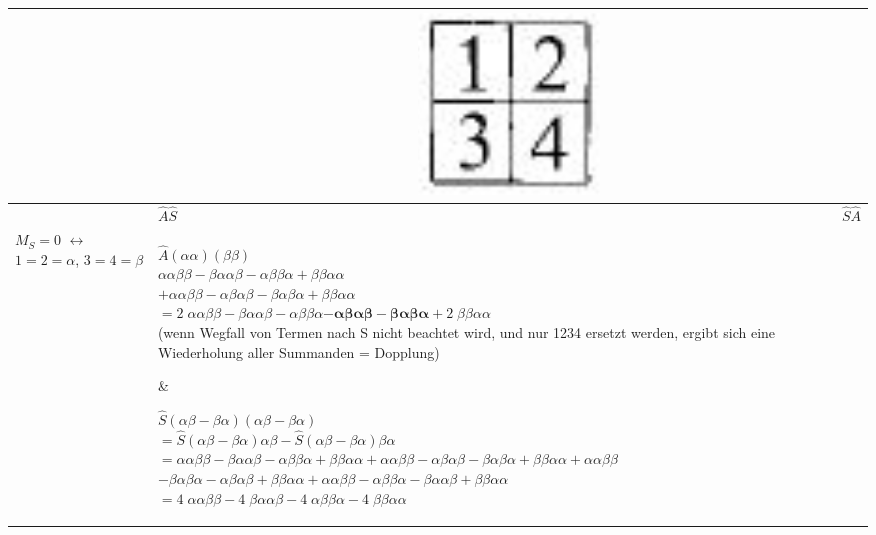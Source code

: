 \documentclass[12pt,a4paper]{article}
\begin{document}
\begin{table}[H]
\begin{tabular}{|p{2cm}|p{7cm}|p{7cm}|}
  \hline 
 & \multicolumn{2}{c|}{ \includegraphics[scale=0.2]{build/young-2hoch2-12.png} } \\
  \hline 
& $\hat{A}\hat{S}$ & $\hat{S}\hat{A}$ \\ \hline
$M_S = 0$ $\leftrightarrow$ $1=2=\alpha$, $ 3=4=\beta$ & 
\parbox[t][11em]{7cm}{
$\hat{A} \left( \alpha\alpha \right) \left(\beta\beta\right) $ \\
$
\alpha\alpha\beta\beta - \beta\alpha\alpha\beta - \alpha\beta\beta\alpha + \beta\beta\alpha\alpha $\\
$+ \alpha\alpha\beta\beta - \alpha\beta\alpha\beta - \beta\alpha \beta \alpha 
+ \beta\beta\alpha\alpha $ \\
 $ = 2\;\alpha\alpha\beta\beta 
 - \beta\alpha\alpha\beta - \alpha\beta\beta\alpha
  \boldsymbol{- \alpha\beta\alpha\beta - \beta\alpha\beta\alpha}
 + 2\;\beta\beta\alpha\alpha  $ \\
 (wenn Wegfall von Termen nach S nicht beachtet wird, und nur 1234 ersetzt werden, ergibt sich eine Wiederholung aller Summanden = Dopplung)
} & 
\parbox[t][10em]{7cm}{
$\hat{S}\left( \alpha\beta -\beta\alpha\right)\left(\alpha\beta - \beta\alpha \right)$ \\
$ = \hat{S}\left( \alpha\beta -\beta\alpha\right)\alpha\beta - \hat{S} \left( \alpha\beta -\beta\alpha\right) \beta\alpha  $ \\
$= \alpha\alpha\beta\beta - \beta\alpha\alpha\beta - \alpha\beta\beta\alpha + \beta\beta\alpha\alpha + \alpha\alpha\beta\beta - \alpha\beta\alpha\beta - \beta\alpha\beta\alpha + \beta\beta\alpha\alpha +\alpha\alpha\beta\beta$ \\$
 - \beta\alpha\beta\alpha - \alpha\beta\alpha\beta + \beta\beta\alpha\alpha + \alpha\alpha\beta\beta - \alpha\beta\beta\alpha - \beta\alpha\alpha\beta + \beta\beta\alpha\alpha $ \\
$= 4\;\alpha\alpha\beta\beta 
- 4\;\beta\alpha\alpha\beta
- 4\; \alpha\beta\beta\alpha
- 4\; \beta\beta\alpha\alpha$
} \\ \hline
\end{tabular}
\end{table}
\end{document}

